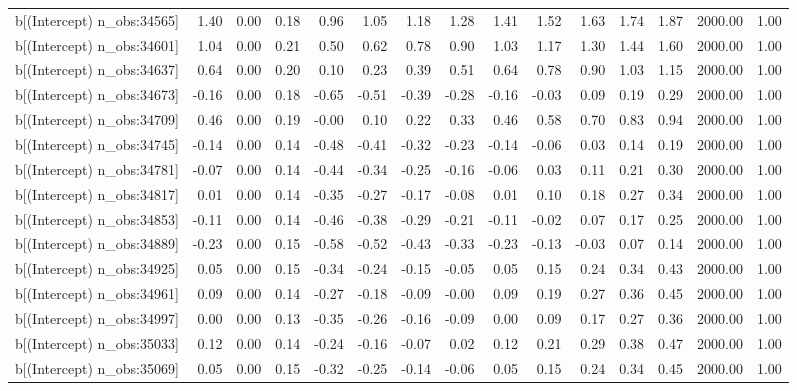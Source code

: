 \begin{table}[ht]
\begin{tabular}{rrrrrrrrrrrrrrr}
  b[(Intercept) n\_obs:34565] & 1.40 & 0.00 & 0.18 & 0.96 & 1.05 & 1.18 & 1.28 & 1.41 & 1.52 & 1.63 & 1.74 & 1.87 & 2000.00 & 1.00 \\ 
  b[(Intercept) n\_obs:34601] & 1.04 & 0.00 & 0.21 & 0.50 & 0.62 & 0.78 & 0.90 & 1.03 & 1.17 & 1.30 & 1.44 & 1.60 & 2000.00 & 1.00 \\ 
  b[(Intercept) n\_obs:34637] & 0.64 & 0.00 & 0.20 & 0.10 & 0.23 & 0.39 & 0.51 & 0.64 & 0.78 & 0.90 & 1.03 & 1.15 & 2000.00 & 1.00 \\ 
  b[(Intercept) n\_obs:34673] & -0.16 & 0.00 & 0.18 & -0.65 & -0.51 & -0.39 & -0.28 & -0.16 & -0.03 & 0.09 & 0.19 & 0.29 & 2000.00 & 1.00 \\ 
  b[(Intercept) n\_obs:34709] & 0.46 & 0.00 & 0.19 & -0.00 & 0.10 & 0.22 & 0.33 & 0.46 & 0.58 & 0.70 & 0.83 & 0.94 & 2000.00 & 1.00 \\ 
  b[(Intercept) n\_obs:34745] & -0.14 & 0.00 & 0.14 & -0.48 & -0.41 & -0.32 & -0.23 & -0.14 & -0.06 & 0.03 & 0.14 & 0.19 & 2000.00 & 1.00 \\ 
  b[(Intercept) n\_obs:34781] & -0.07 & 0.00 & 0.14 & -0.44 & -0.34 & -0.25 & -0.16 & -0.06 & 0.03 & 0.11 & 0.21 & 0.30 & 2000.00 & 1.00 \\ 
  b[(Intercept) n\_obs:34817] & 0.01 & 0.00 & 0.14 & -0.35 & -0.27 & -0.17 & -0.08 & 0.01 & 0.10 & 0.18 & 0.27 & 0.34 & 2000.00 & 1.00 \\ 
  b[(Intercept) n\_obs:34853] & -0.11 & 0.00 & 0.14 & -0.46 & -0.38 & -0.29 & -0.21 & -0.11 & -0.02 & 0.07 & 0.17 & 0.25 & 2000.00 & 1.00 \\ 
  b[(Intercept) n\_obs:34889] & -0.23 & 0.00 & 0.15 & -0.58 & -0.52 & -0.43 & -0.33 & -0.23 & -0.13 & -0.03 & 0.07 & 0.14 & 2000.00 & 1.00 \\ 
  b[(Intercept) n\_obs:34925] & 0.05 & 0.00 & 0.15 & -0.34 & -0.24 & -0.15 & -0.05 & 0.05 & 0.15 & 0.24 & 0.34 & 0.43 & 2000.00 & 1.00 \\ 
  b[(Intercept) n\_obs:34961] & 0.09 & 0.00 & 0.14 & -0.27 & -0.18 & -0.09 & -0.00 & 0.09 & 0.19 & 0.27 & 0.36 & 0.45 & 2000.00 & 1.00 \\ 
  b[(Intercept) n\_obs:34997] & 0.00 & 0.00 & 0.13 & -0.35 & -0.26 & -0.16 & -0.09 & 0.00 & 0.09 & 0.17 & 0.27 & 0.36 & 2000.00 & 1.00 \\ 
  b[(Intercept) n\_obs:35033] & 0.12 & 0.00 & 0.14 & -0.24 & -0.16 & -0.07 & 0.02 & 0.12 & 0.21 & 0.29 & 0.38 & 0.47 & 2000.00 & 1.00 \\ 
  b[(Intercept) n\_obs:35069] & 0.05 & 0.00 & 0.15 & -0.32 & -0.25 & -0.14 & -0.06 & 0.05 & 0.15 & 0.24 & 0.34 & 0.45 & 2000.00 & 1.00 \\ 

\end{tabular}
\end{table}
